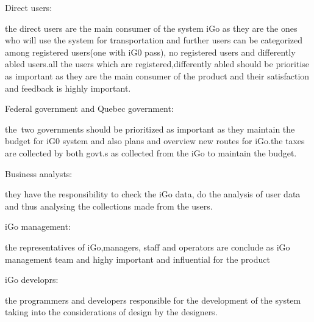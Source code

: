 \documentclass[12pt]{article}
\begin{document}
\vspace{\baselineskip}
Direct users:\par

the direct users are the main consumer of the system iGo as they are the ones who will use the system for transportation and further users can be categorized among registered users(one with iG0 pass), no registered users and differently abled users.all the users which are registered,differently abled should be prioritise as important as they are the main consumer of the product and their satisfaction and feedback is highly important.\par


\vspace{\baselineskip}
Federal government and Quebec government:\par

the\ two governments should be prioritized as important as they maintain the budget for iG0 system and also plans and overview new routes for  iGo.the taxes are collected by both govt.s as collected from the iGo to maintain the budget.\par


\vspace{\baselineskip}

\vspace{\baselineskip}
Business analysts:\par

they have the responsibility to check the iGo data, do the analysis of user data and thus analysing the collections made from the users.\par


\vspace{\baselineskip}
iGo management:\par

the representatives of iGo,managers, staff and operators are conclude as iGo management team and highy important and influential for the product\par


\vspace{\baselineskip}
iGo developrs:\par

the programmers and developers responsible for the development of the system taking into the considerations of design by the designers.\par


\vspace{\baselineskip}

\vspace{\baselineskip}
\end{document}
